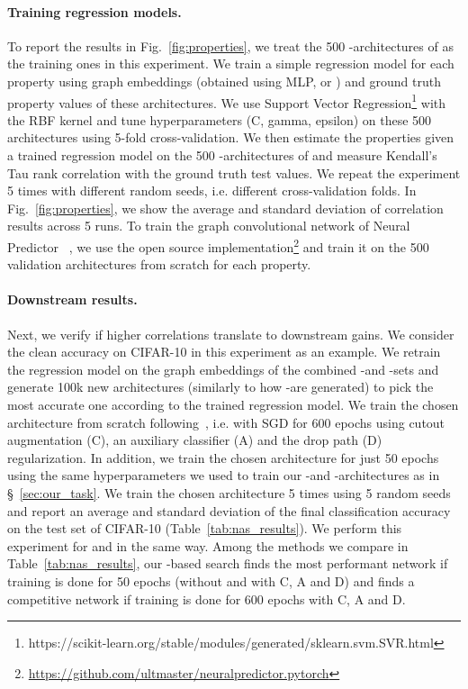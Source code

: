 \paragraph{Training regression models.} To report the results in Fig.~\ref{fig:properties}, we treat the 500 \iid-\iidval architectures of \dataset as the training ones in this experiment. We train a simple regression model for each property using graph embeddings (obtained using MLP, \ghnbase or \ghnours) and ground truth property values of these architectures. We use Support Vector Regression\footnote{https://scikit-learn.org/stable/modules/generated/sklearn.svm.SVR.html} with the RBF kernel and tune hyperparameters (C, gamma, epsilon) on these 500 architectures using 5-fold cross-validation. We then estimate the properties given a trained regression model on the 500 \iid-\iidtest architectures of \dataset and measure Kendall's Tau rank correlation with the ground truth test values. We repeat the experiment 5 times with different random seeds, i.e. different cross-validation folds. In Fig.~\ref{fig:properties}, we show the average and standard deviation of correlation results across 5 runs.
To train the graph convolutional network of Neural Predictor ~\cite{wen2020neural}, we use the open source implementation\footnote{\url{https://github.com/ultmaster/neuralpredictor.pytorch}} and train it on the 500 validation architectures from scratch for each property.

\paragraph{Downstream results.} Next, we verify if higher correlations translate to downstream gains. We consider the clean accuracy on CIFAR-10 in this experiment as an example. We retrain the regression model on the graph embeddings of the combined \iid-\iidval and \iid-\iidtest sets and generate 100k new architectures (similarly to how \iid-\iidtest are generated) to pick the most accurate one according to the trained regression model. We train the chosen architecture from scratch following~\cite{liu2018darts,zhang2018graph,chen2019progressive}, i.e. with SGD for 600 epochs using cutout augmentation (C), an auxiliary classifier (A) and the drop path (D) regularization. In addition, we train the chosen architecture for just 50 epochs using the same hyperparameters we used to train our \iid-\iidval and \iid-\iidtest architectures as in \S~\ref{sec:our_task}. We train the chosen architecture 5 times using 5 random seeds and report an average and standard deviation of the final classification accuracy on the test set of CIFAR-10 (Table~\ref{tab:nas_results}). We perform this experiment for \ghnbase and \ghnours in the same way.
Among the methods we compare in Table~\ref{tab:nas_results}, our \ghnours-based search finds the most performant network if training is done for 50 epochs (without and with C, A and D) and finds a competitive network if training is done for 600 epochs with C, A and D.

